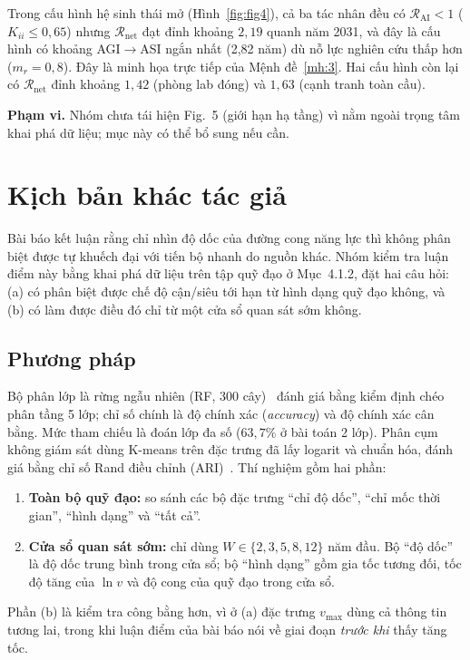 \documentclass[12pt,a4paper,openany]{report}
\numberwithin{equation}{chapter}   %
\theoremstyle{definition}
\newcommand{\RAI}{\mathcal{R}_{\mathrm{AI}}}
\newcommand{\Rnet}{\mathcal{R}_{\mathrm{net}}}
\newcommand{\en}[1]{\textit{#1}}   %
\begin{document}
Trong cấu hình hệ sinh thái mở (Hình~\ref{fig:fig4}), cả ba tác nhân đều có $\RAI<1$ ($K_{ii}\le 0{,}65$) nhưng $\Rnet$ đạt đỉnh khoảng $2{,}19$ quanh năm 2031, và đây là cấu hình có khoảng AGI$\to$ASI ngắn nhất (2,82 năm) dù nỗ lực nghiên cứu thấp hơn ($m_r=0{,}8$). Đây là minh họa trực tiếp của Mệnh đề~\ref{mh:3}. Hai cấu hình còn lại có $\Rnet$ đỉnh khoảng $1{,}42$ (phòng lab đóng) và $1{,}63$ (cạnh tranh toàn cầu).

\textbf{Phạm vi.} Nhóm chưa tái hiện Fig.~5 (giới hạn hạ tầng) vì nằm ngoài trọng tâm khai phá dữ liệu; mục này có thể bổ sung nếu cần.

\section{Kịch bản khác tác giả}\label{sec:khac}
Bài báo kết luận rằng chỉ nhìn độ dốc của đường cong năng lực thì không phân biệt được tự khuếch đại với tiến bộ nhanh do nguồn khác. Nhóm kiểm tra luận điểm này bằng khai phá dữ liệu trên tập quỹ đạo ở Mục~4.1.2, đặt hai câu hỏi: (a) có phân biệt được chế độ cận/siêu tới hạn từ hình dạng quỹ đạo không, và (b) có làm được điều đó chỉ từ một cửa sổ quan sát sớm không.

\subsection{Phương pháp}
Bộ phân lớp là rừng ngẫu nhiên (RF, 300 cây)~\cite{breiman2001} đánh giá bằng kiểm định chéo phân tầng 5 lớp; chỉ số chính là độ chính xác (\en{accuracy}) và độ chính xác cân bằng. Mức tham chiếu là đoán lớp đa số ($63{,}7\%$ ở bài toán 2 lớp). Phân cụm không giám sát dùng K-means trên đặc trưng đã lấy logarit và chuẩn hóa, đánh giá bằng chỉ số Rand điều chỉnh (ARI)~\cite{hubert1985}. Thí nghiệm gồm hai phần:
\begin{enumerate}[label=(\alph*)]
  \item \textbf{Toàn bộ quỹ đạo:} so sánh các bộ đặc trưng ``chỉ độ dốc'', ``chỉ mốc thời gian'', ``hình dạng'' và ``tất cả''.
  \item \textbf{Cửa sổ quan sát sớm:} chỉ dùng $W\in\{2,3,5,8,12\}$ năm đầu. Bộ ``độ dốc'' là độ dốc trung bình trong cửa sổ; bộ ``hình dạng'' gồm gia tốc tương đối, tốc độ tăng của $\ln v$ và độ cong của quỹ đạo trong cửa sổ.
\end{enumerate}
Phần (b) là kiểm tra công bằng hơn, vì ở (a) đặc trưng $v_{\max}$ dùng cả thông tin tương lai, trong khi luận điểm của bài báo nói về giai đoạn \emph{trước khi} thấy tăng tốc.
\end{document}
